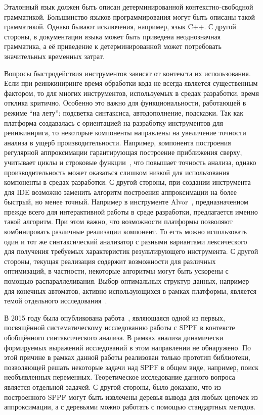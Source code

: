 Эталонный язык должен быть описан детерминированной контекстно-свободной грамматикой. Большинство языков программирования могут быть описаны такой грамматикой. Однако бывают исключения, например, язык C++. С другой стороны, в документации языка может быть приведена неоднозначная грамматика, а её приведение к детерминированной может потребовать значительных временных затрат. 

Вопросы быстродействия инструментов зависят от контекста их использования. Если при реинжиниринге время обработки кода не всегда является существенным фактором, то для многих инструментов, используемых  в средах разработки, время отклика критично.  Особенно это важно для функциональности, работающей в режиме ``на лету'': подсветка синтаксиса, автодополнение, подсказки. Так как платформа создавалась с ориентацией на разработку инструментов для реинжинирига, то некоторые компоненты направлены на увеличение точности анализа в ущерб производительности. Например, компонента построения регулярной аппроксимации гарантирующая построение приближения сверху, учитывает циклы и строковые функции~\cite{RegOverApprox}, что повышает точность анализа, однако производительность может оказаться слишком низкой для использования компоненты в средах разработки. С другой стороны, при создании инструмента для IDE возможно заменить алгоритм построения аппроксимации на более быстрый, но менее точный. Например в инструменте Alvor~\cite{Alvor2}, предназначенном прежде всего для интерактивной работы в среде разработки, предлагается именно такой алгоритм.  При этом важно, что возможности платформы позволяют комбинировать различные реализации компонент. То есть можно использовать один и тот же синтаксический анализатор с разными вариантами лексического для получения требуемых характеристик результирующего инструмента. С другой стороны, текущая реализация содержит возможности для различных оптимизаций, в частности, некоторые алгоритмы могут быть ускорены с помощью распараллеливания. Выбор оптимальных структур данных, например для конечных автоматов, активно использующихся в рамках платформы, является темой отдельного исследования~\cite{DataStructureForFA}.

В 2015 году была опубликована работа~\cite{SPPF2015}, являющаяся одной из первых, посвящённой систематическому исследованию работы с SPPF в контексте обобщённого синтаксического анализа. В рамках  анализа динамически формируемых выражений исследований в этом направлении не обнаружено. По этой причине в рамках данной работы реализован только прототип библиотеки, позволяющей решать некоторые задачи над SPPF в общем виде, например, поиск необъявленных переменных. Теоретическое исследование данного вопроса является отдельной задачей. С другой стороны, было доказано, что из построенного SPPF могут быть извлечены деревья вывода для любых цепочек из аппроксимации, а с деревьями можно работать с помощью стандартных методов. 

\clearpage

